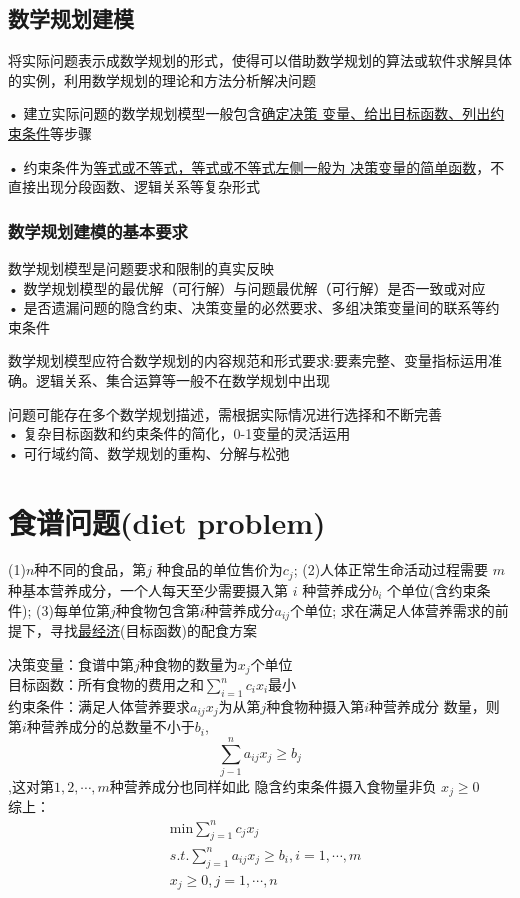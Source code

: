 \documentclass[10t, a4paper, oneside]{ctexbook}
\begin{document}
\subsection{数学规划建模}
将实际问题表示成数学规划的形式，使得可以借助数学规划的算法或软件求解具体的实例，利用数学规划的理论和方法分析解决问题

• 建立实际问题的数学规划模型一般包含\underline{确定决策
变量、给出目标函数、列出约束条件}等步骤

• 约束条件为\underline{等式或不等式，等式或不等式左侧一般为
决策变量的简单函数}，不直接出现分段函数、逻辑关系等复杂形式
\subsubsection{数学规划建模的基本要求}

数学规划模型是问题要求和限制的真实反映\\
• 数学规划模型的最优解（可行解）与问题最优解（可行解）是否一致或对应\\
• 是否遗漏问题的隐含约束、决策变量的必然要求、多组决策变量间的联系等约束条件

数学规划模型应符合数学规划的内容规范和形式要求:要素完整、变量指标运用准确。逻辑关系、集合运算等一般不在数学规划中出现

问题可能存在多个数学规划描述，需根据实际情况进行选择和不断完善\\
• 复杂目标函数和约束条件的简化，0-1变量的灵活运用\\
• 可行域约简、数学规划的重构、分解与松弛

\section{食谱问题(diet problem)}
(1)$n$种不同的食品，第$j$ 种食品的单位售价为$c_j$;
(2)人体正常生命活动过程需要 $m$ 种基本营养成分，一个人每天至少需要摄入第 $i$ 种营养成分$b_i$ 个单位(含约束条件);
(3)每单位第$j$种食物包含第$i$种营养成分$a_{ij}$个单位;
求在满足人体营养需求的前提下，寻找\underline{最经济}(目标函数)的配食方案

决策变量：食谱中第$j$种食物的数量为$x_j$个单位\\
目标函数：所有食物的费用之和$\sum_{i=  1}^n c_{i}x_i$最小\\
约束条件：满足人体营养要求$a_{ij}x_j$为从第$j$种食物种摄入第$i$种营养成分
数量，则第$i$种营养成分的总数量不小于$b_i$, $$\sum_{j - 1}^n a_{ij}x_j \ge b_j$$,这对第$1,2,\cdots,m$种营养成分也同样如此
隐含约束条件摄入食物量非负 $x_j \ge 0$\\
综上：
$$\begin{aligned}
    &\text{min} \sum_{j=1}^{n}c_{j}x_{j}  \\
    &s.t. \sum_{j=1}^{n}a_{ij}x_{j}\geq b_{i},i=1,\cdots,m  \\
    &x_{j}\geq0,j=1,\cdots,n
    \end{aligned}$$
\end{document}
